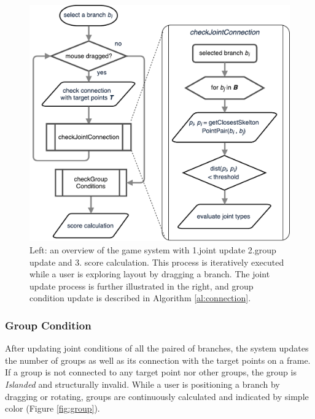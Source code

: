 \begin{figure}[ht]
	\begin{center}
		\includegraphics[width = 0.35\paperwidth]{images/system/closestPointAlgorithm.pdf}
		\caption{Left: an overview of the game system with 1.joint update 2.group update and 3. score calculation. This process is iteratively executed while a user is exploring layout by dragging a branch. The joint update process is further illustrated in the right, and group condition update is described in Algorithm \ref{al:connection}. }
		\label{fig:system_flowchart}
	\end{center}
\end{figure}




\subsubsection{Group Condition}

After updating joint conditions of all the paired of branches, the system updates the number of groups as well as its connection with the target points on a frame.
If a group is not connected to any target point nor other groups, the group is \textit{Islanded} and structurally invalid.
While a user is positioning a branch by dragging or rotating, groups are continuously calculated and indicated by simple color (Figure \ref{fig:group}).

